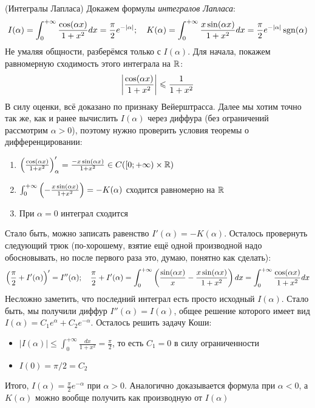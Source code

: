 \begin{example} (Интегралы Лапласа)
	Докажем формулы \textit{интегралов Лапласа}:
	\[
		I(\alpha) = \int_0^{+\infty} \frac{\cos(\alpha x)}{1 + x^2}dx = \frac{\pi}{2}e^{-|\alpha|}; \quad K(\alpha) = \int_0^{+\infty} \frac{x\sin(\alpha x)}{1 + x^2}dx = \frac{\pi}{2}e^{-|\alpha|}\operatorname{sgn}(\alpha)
	\]
	Не умаляя общности, разберёмся только с $I(\alpha)$. Для начала, покажем равномерную сходимость этого интеграла на $\mathbb{R}$:
	\[
		\left|\frac{\cos(\alpha x)}{1 + x^2}\right| \leqslant \frac{1}{1 + x^2}
	\]
	В силу оценки, всё доказано по признаку Вейерштрасса. Далее мы хотим точно так же, как и ранее вычислить $I(\alpha)$ через диффура (без ограничений рассмотрим $\alpha > 0$), поэтому нужно проверить условия теоремы о дифференцировании:
	\begin{enumerate}
		\item $\left(\frac{\cos(\alpha x)}{1 + x^2}\right)'_\alpha = \frac{-x\sin(\alpha x)}{1 + x^2} \in C(\left[0; +\infty\right) \times \mathbb{R})$
		
		\item $\int_0^{+\infty} \left(-\frac{x\sin(\alpha x)}{1 + x^2}\right) = -K(\alpha)$ сходится равномерно на $\mathbb{R}$
		
		\item При $\alpha = 0$ интеграл сходится
	\end{enumerate}
	Стало быть, можно записать равенство $I'(\alpha) = -K(\alpha)$. Осталось провернуть следующий трюк (по-хорошему, взятие ещё одной производной надо обосновывать, но после первого раза это, думаю, понятно как сделать):
	\[
		\left(\frac{\pi}{2} + I'(\alpha)\right)' = I''(\alpha); \quad \frac{\pi}{2} + I'(\alpha) = \int_0^{+\infty} \left(\frac{\sin(\alpha x)}{x} - \frac{x\sin(\alpha x)}{1 + x^2}\right)dx = \int_0^{+\infty} \frac{\cos(\alpha x)}{1 + x^2}dx
	\]
	Несложно заметить, что последний интеграл есть просто исходный $I(\alpha)$. Стало быть, мы получили диффур $I''(\alpha) = I(\alpha)$, общее решение которого имеет вид $I(\alpha) = C_1e^{\alpha} + C_2e^{-\alpha}$. Осталось решить задачу Коши:
	\begin{itemize}
		\item $|I(\alpha)| \le \int_0^{+\infty} \frac{dx}{1 + x^2} = \frac{\pi}{2}$, то есть $C_1 = 0$ в силу ограниченности
		
		\item $I(0) = \pi / 2 = C_2$
	\end{itemize}
	Итого, $I(\alpha) = \frac{\pi}{2}e^{-\alpha}$ при $\alpha > 0$. Аналогично доказывается формула при $\alpha < 0$, а $K(\alpha)$ можно вообще получить как производную от $I(\alpha)$
\end{example}

